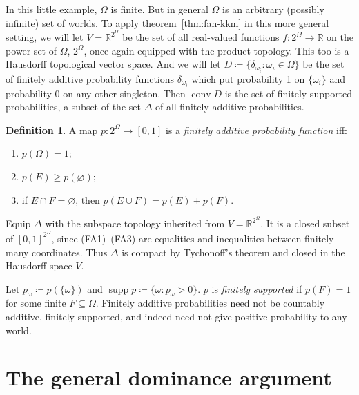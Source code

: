 \documentclass[11pt]{article}
\newcommand{\chg}[1]{{\color{red}#1}}
\theoremstyle{definition}
\newtheorem{definition}[theorem]{Definition}
\theoremstyle{remark}
\newcommand{\supp}{\operatorname{supp}}
\begin{document}
In this little example, $\Omega$ is finite. But in general $\Omega$ is an arbitrary (possibly infinite) set of worlds. To apply theorem~\ref{thm:fan-kkm} in this more general setting, we will let $V=\mathbb R^{2^\Omega}$ be the set of all real-valued functions $f:2^\Omega\rightarrow\mathbb R$ on the power set of $\Omega$, $2^\Omega$, once again equipped with the product topology. This too is a Hausdorff topological vector space. And we will let $D\coloneqq\{\delta_{\omega_i}:\omega_i\in\Omega\}$ be the set of finitely additive probability functions $\delta_{\omega_i}$ which put probability 1 on $\{\omega_i\}$ and probability 0 on any other singleton. \chg{Then $\operatorname{conv}D$ is the set of finitely supported probabilities, a subset of the set $\Delta$ of all finitely additive probabilities.}



\begin{definition}\label{def:finitely-additive-probability}
A map $p:2^\Omega\to[0,1]$ is a \emph{finitely additive probability function} iff:
\begin{enumerate}[label=\textup{(FA\arabic*)}]
  \item $p(\Omega)=1$;
  \item $p(E)\geq p(\varnothing)$;
  \item if $E\cap F=\varnothing$, then $p(E\cup F)=p(E)+p(F)$.
\end{enumerate}
\end{definition}


\chg{Equip $\Delta$ with the subspace topology inherited from $V=\mathbb R^{2^\Omega}$. It is a closed subset of $[0,1]^{2^\Omega}$, since (FA1)--(FA3) are equalities and inequalities between finitely many coordinates. Thus $\Delta$ is compact by Tychonoff's theorem and closed in the Hausdorff space $V$.}

Let $p_\omega\coloneqq p(\{\omega\})$ and $\supp p\coloneqq\{\omega:p_\omega>0\}$.  $p$ is \emph{finitely supported} if $p(F)=1$ for some finite $F\subseteq\Omega$. Finitely additive probabilities need not be countably additive, finitely supported, and indeed need not give positive probability to any world.





\section{The general dominance argument}\label{sec:gen-dom}
\end{document}
